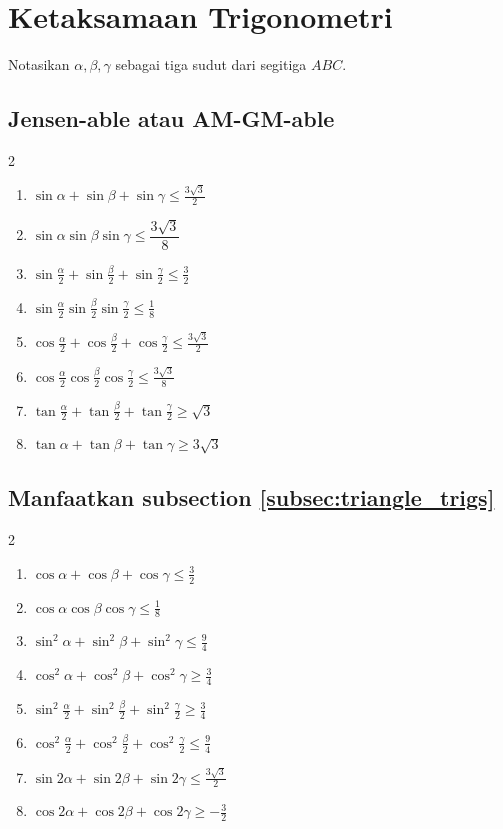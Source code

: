 \documentclass[11pt]{scrartcl}
\begin{document}
\section{Ketaksamaan Trigonometri}
Notasikan $\alpha, \beta, \gamma$ sebagai tiga sudut dari segitiga $ABC$.
\subsection{Jensen-able atau AM-GM-able}
\begin{multicols}{2}
\begin{enumerate}
    \item $\sin{\alpha} + \sin{\beta} + \sin{\gamma} \leq \frac{3\sqrt{3}}{2}$
    \item $\sin{\alpha}\sin{\beta}\sin{\gamma} \leq \dfrac{3\sqrt{3}}{8}$
    \item $\sin{\frac{\alpha}{2}} + \sin{\frac{\beta}{2}} + \sin{\frac{\gamma}{2}} \leq \frac{3}{2}$
    \item $\sin{\frac{\alpha}{2}}\sin{\frac{\beta}{2}}\sin{\frac{\gamma}{2}} \leq \frac{1}{8}$
    \item $\cos{\frac{\alpha}{2}} + \cos{\frac{\beta}{2}} + \cos{\frac{\gamma}{2}} \leq \frac{3\sqrt{3}}{2}$
    \item $\cos{\frac{\alpha}{2}}\cos{\frac{\beta}{2}}\cos{\frac{\gamma}{2}} \leq \frac{3\sqrt{3}}{8}$
    \item $\tan{\frac{\alpha}{2}} + \tan{\frac{\beta}{2}} + \tan{\frac{\gamma}{2}} \geq \sqrt{3}$
    \item $\tan{\alpha} + \tan{\beta} + \tan{\gamma} \geq 3\sqrt{3}$
\end{enumerate}
\end{multicols}
\subsection{Manfaatkan subsection \ref{subsec:triangle_trigs}}
\begin{multicols}{2}
\begin{enumerate}   
    \item $\cos{\alpha} + \cos{\beta} + \cos{\gamma} \leq \frac{3}{2}$
    \item $\cos{\alpha}\cos{\beta}\cos{\gamma} \leq \frac{1}{8}$
    \item $\sin^2{\alpha} + \sin^2{\beta} + \sin^2{\gamma} \leq \frac{9}{4}$
    \item $\cos^2{\alpha} + \cos^2{\beta} + \cos^2{\gamma} \geq \frac{3}{4}$
    \item $\sin^2{\frac{\alpha}{2}} + \sin^2{\frac{\beta}{2}} + \sin^2{\frac{\gamma}{2}} \geq \frac{3}{4}$
    \item $\cos^2{\frac{\alpha}{2}} + \cos^2{\frac{\beta}{2}} + \cos^2{\frac{\gamma}{2}} \leq \frac{9}{4}$
    \item $\sin{2\alpha} + \sin{2\beta} + \sin{2\gamma} \leq \frac{3\sqrt{3}}{2}$
    \item $\cos{2\alpha} + \cos{2\beta} + \cos{2\gamma} \geq -\frac{3}{2}$
\end{enumerate}
\end{multicols}
\end{document}
